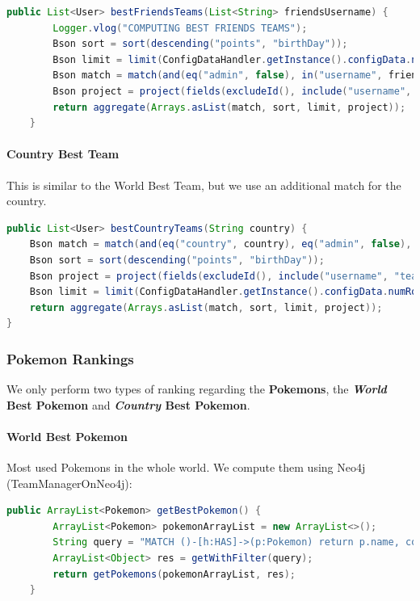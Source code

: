 \begin{lstlisting}[language=Java]
	public List<User> bestFriendsTeams(List<String> friendsUsername) {
		Logger.vlog("COMPUTING BEST FRIENDS TEAMS");
		Bson sort = sort(descending("points", "birthDay"));
		Bson limit = limit(ConfigDataHandler.getInstance().configData.numRowsRanking);
		Bson match = match(and(eq("admin", false), in("username", friendsUsername), lte("lastLogin", getDateThresholdForRanking())));
		Bson project = project(fields(excludeId(), include("username", "teamName", "points", "birthDay", "country")));
		return aggregate(Arrays.asList(match, sort, limit, project));
	}
\end{lstlisting}

\paragraph{Country Best Team}
This is similar to the World Best Team, but we use an additional match for the country.

\begin{lstlisting}[language=Java]
public List<User> bestCountryTeams(String country) {
	Bson match = match(and(eq("country", country), eq("admin", false), lte("lastLogin", getDateThresholdForRanking())));
	Bson sort = sort(descending("points", "birthDay"));
	Bson project = project(fields(excludeId(), include("username", "teamName", "points", "birthDay", "country")));
	Bson limit = limit(ConfigDataHandler.getInstance().configData.numRowsRanking);
	return aggregate(Arrays.asList(match, sort, limit, project));
}

\end{lstlisting}


\subsubsection{Pokemon Rankings}
We only perform two types of ranking regarding the \textbf{Pokemons}, the \textbf{\textit{World} Best Pokemon} and \textbf{\textit{Country} Best Pokemon}.

\paragraph{World Best Pokemon}
Most used Pokemons in the whole world. We compute them using Neo4j (TeamManagerOnNeo4j):

\begin{lstlisting}[language=Java]
	public ArrayList<Pokemon> getBestPokemon() {
		ArrayList<Pokemon> pokemonArrayList = new ArrayList<>();
		String query = "MATCH ()-[h:HAS]->(p:Pokemon) return p.name, count(h) AS held, p.sprite ORDER BY held DESC LIMIT " +  + ConfigDataHandler.getInstance().configData.numRowsRanking;
		ArrayList<Object> res = getWithFilter(query);
		return getPokemons(pokemonArrayList, res);
	}
\end{lstlisting}

